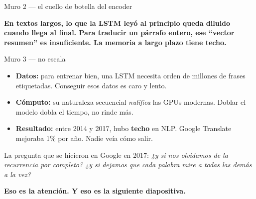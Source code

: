 \documentclass[aspectratio=169, 11pt]{beamer}
\begin{document}
\begin{frame}[shrink]{Muro 2 --- el cuello de botella del encoder}
  \begin{center}
  \end{center}
  \vspace{10pt}
  \begin{tcolorbox}[colback=arcaRed!8, colframe=arcaRed, leftrule=3pt,
    boxrule=0pt, sharp corners, left=8pt, right=8pt, top=4pt, bottom=4pt]
    {\footnotesize\color{arcaDark}\bfseries
    En textos largos, lo que la LSTM leyó al principio queda diluido cuando
    llega al final. Para traducir un párrafo entero, ese ``vector resumen'' es
    insuficiente. La memoria a largo plazo tiene techo.}
  \end{tcolorbox}
\end{frame}

\begin{frame}[shrink]{Muro 3 --- no escala}
  \vspace{4pt}
  \begin{itemize}\setlength{\itemsep}{6pt}
    \footnotesize
    \item \textbf{Datos:} para entrenar bien, una LSTM necesita orden de millones de
    frases etiquetadas. Conseguir esos datos es caro y lento.
    \item \textbf{Cómputo:} su naturaleza secuencial \emph{nulifica} las GPUs modernas.
    Doblar el modelo dobla el tiempo, no rinde más.
    \item \textbf{Resultado:} entre 2014 y 2017, hubo \textbf{techo} en NLP. Google
    Translate mejoraba 1\% por año. Nadie veía cómo salir.
  \end{itemize}
  \vspace{8pt}
  \begin{tcolorbox}[colback=arcaGray, colframe=arcaRed, leftrule=3pt,
    boxrule=0pt, sharp corners, left=8pt, right=8pt, top=6pt, bottom=6pt]
    {\small\color{arcaDark}
    La pregunta que se hicieron en Google en 2017: \emph{¿y si nos olvidamos de la
    recurrencia por completo? ¿y si dejamos que cada palabra mire a todas las demás
    a la vez?}\par}
    \vspace{2pt}
    {\small\color{arcaDark}\bfseries Eso es la atención. Y eso es la siguiente diapositiva.}
  \end{tcolorbox}
\end{frame}
\end{document}
